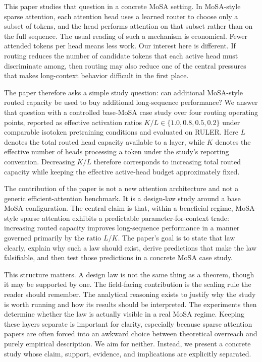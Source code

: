 \documentclass[11pt]{article}
\begin{document}
This paper studies that question in a concrete MoSA setting. In MoSA-style sparse attention, each attention head uses a learned router to choose only a subset of tokens, and the head performs attention on that subset rather than on the full sequence. The usual reading of such a mechanism is economical. Fewer attended tokens per head means less work. Our interest here is different. If routing reduces the number of candidate tokens that each active head must discriminate among, then routing may also reduce one of the central pressures that makes long-context behavior difficult in the first place.

The paper therefore asks a simple study question: can additional MoSA-style routed capacity be used to buy additional long-sequence performance? We answer that question with a controlled base-MoSA case study over four routing operating points, reported as effective activation ratios $K/L \in \{1.0, 0.8, 0.5, 0.2\}$ under comparable isotoken pretraining conditions and evaluated on RULER. Here $L$ denotes the total routed head capacity available to a layer, while $K$ denotes the effective number of heads processing a token under the study's reporting convention. Decreasing $K/L$ therefore corresponds to increasing total routed capacity while keeping the effective active-head budget approximately fixed.

The contribution of the paper is not a new attention architecture and not a generic efficient-attention benchmark. It is a design-law study around a base MoSA configuration. The central claim is that, within a beneficial regime, MoSA-style sparse attention exhibits a predictable parameter-for-context trade: increasing routed capacity improves long-sequence performance in a manner governed primarily by the ratio $L/K$. The paper's goal is to state that law clearly, explain why such a law should exist, derive predictions that make the law falsifiable, and then test those predictions in a concrete MoSA case study.

This structure matters. A design law is not the same thing as a theorem, though it may be supported by one. The field-facing contribution is the scaling rule the reader should remember. The analytical reasoning exists to justify why the study is worth running and how its results should be interpreted. The experiments then determine whether the law is actually visible in a real MoSA regime. Keeping these layers separate is important for clarity, especially because sparse attention papers are often forced into an awkward choice between theoretical overreach and purely empirical description. We aim for neither. Instead, we present a concrete study whose claim, support, evidence, and implications are explicitly separated.
\end{document}
